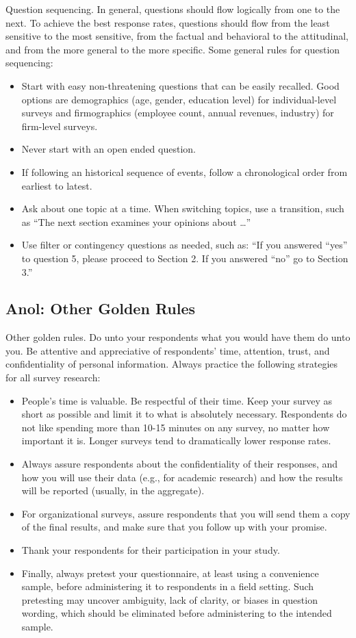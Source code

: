 Question sequencing. In general, questions should flow logically from one to the next. To achieve the best response rates, questions should flow from the least sensitive to the most sensitive, from the factual and behavioral to the attitudinal, and from the more general to the more specific. Some general rules for question sequencing:

\begin{itemize}
	\item Start with easy non-threatening questions that can be easily recalled. Good options are 	demographics (age, gender, education level) for individual-level surveys and firmographics (employee count, annual revenues, industry) for firm-level surveys.
	\item Never start with an open ended question.
	\item If following an historical sequence of events, follow a chronological order from earliest to latest.
	\item Ask about one topic at a time. When switching topics, use a transition, such as “The next section examines your opinions about …”
	\item Use filter or contingency questions as needed, such as: “If you answered “yes” to question 5, please proceed to Section 2. If you answered “no” go to Section 3.”
\end{itemize}

\subsection{Anol: Other Golden Rules}

Other golden rules. Do unto your respondents what you would have them do unto you. Be attentive and appreciative of respondents’ time, attention, trust, and confidentiality of personal information. Always practice the following strategies for all survey research:

\begin{itemize}
	\item People’s time is valuable. Be respectful of their time. Keep your survey as short as possible and limit it to what is absolutely necessary. Respondents do not like spending more than 10-15 minutes on any survey, no matter how important it is. Longer surveys tend to dramatically lower response rates.
	\item Always assure respondents about the confidentiality of their responses, and how you will use their data (e.g., for academic research) and how the results will be reported (usually, in the aggregate).
	\item For organizational surveys, assure respondents that you will send them a copy of the final results, and make sure that you follow up with your promise.
	\item Thank your respondents for their participation in your study.
	\item Finally, always pretest your questionnaire, at least using a convenience sample, before administering it to respondents in a field setting. Such pretesting may uncover ambiguity, lack of clarity, or biases in question wording, which should be eliminated before administering to the intended sample.
\end{itemize}

